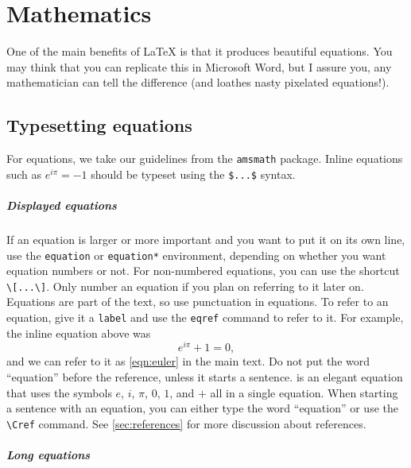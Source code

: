 \chapter{Mathematics}

One of the main benefits of LaTeX is that it produces beautiful equations. You may think that you can replicate this in Microsoft Word, but I assure you, any mathematician can tell the difference (and loathes nasty pixelated equations!).


\section{Typesetting equations}
For equations, we take our guidelines from the \verb|amsmath| package. 
Inline equations such as $e^{i\pi}=-1$ should be typeset using the \verb|$...$| syntax.

\paragraph{Displayed equations}

If an equation is larger or more important and you want to put it on its own line, use the \verb|equation| or \verb|equation*| environment, depending on whether you want equation numbers or not. For non-numbered equations, you can use the shortcut \verb|\[...\]|. Only number an equation if you plan on referring to it later on. Equations are part of the text, so use punctuation in equations. To refer to an equation, give it a \verb|label| and use the \verb|eqref| command to refer to it. For example, the inline equation above was
\begin{equation}\label{eqn:euler}
  e^{i\pi} + 1 = 0,
\end{equation}
and we can refer to it as \eqref{eqn:euler} in the main text. Do not put the word ``equation'' before the reference, unless it starts a sentence.  is an elegant equation that uses the symbols $e$, $i$, $\pi$, $0$, $1$, and $+$ all in a single equation. When starting a sentence with an equation, you can either type the word ``equation'' or use the \verb|\Cref| command. See \cref{sec:references} for more discussion about references.

\paragraph{Long equations}

